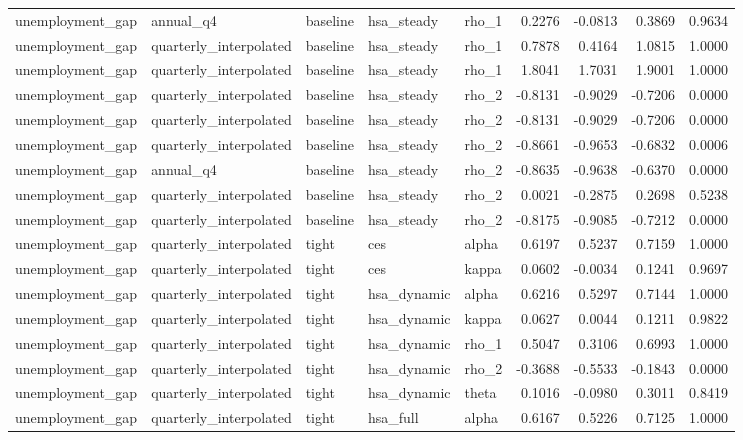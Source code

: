 \begin{tabular}{lllllrrrr}
unemployment\_gap & annual\_q4 & baseline & hsa\_steady & rho\_1 & 0.2276 & -0.0813 & 0.3869 & 0.9634 \\
unemployment\_gap & quarterly\_interpolated & baseline & hsa\_steady & rho\_1 & 0.7878 & 0.4164 & 1.0815 & 1.0000 \\
unemployment\_gap & quarterly\_interpolated & baseline & hsa\_steady & rho\_1 & 1.8041 & 1.7031 & 1.9001 & 1.0000 \\
unemployment\_gap & quarterly\_interpolated & baseline & hsa\_steady & rho\_2 & -0.8131 & -0.9029 & -0.7206 & 0.0000 \\
unemployment\_gap & quarterly\_interpolated & baseline & hsa\_steady & rho\_2 & -0.8131 & -0.9029 & -0.7206 & 0.0000 \\
unemployment\_gap & quarterly\_interpolated & baseline & hsa\_steady & rho\_2 & -0.8661 & -0.9653 & -0.6832 & 0.0006 \\
unemployment\_gap & annual\_q4 & baseline & hsa\_steady & rho\_2 & -0.8635 & -0.9638 & -0.6370 & 0.0000 \\
unemployment\_gap & quarterly\_interpolated & baseline & hsa\_steady & rho\_2 & 0.0021 & -0.2875 & 0.2698 & 0.5238 \\
unemployment\_gap & quarterly\_interpolated & baseline & hsa\_steady & rho\_2 & -0.8175 & -0.9085 & -0.7212 & 0.0000 \\
unemployment\_gap & quarterly\_interpolated & tight & ces & alpha & 0.6197 & 0.5237 & 0.7159 & 1.0000 \\
unemployment\_gap & quarterly\_interpolated & tight & ces & kappa & 0.0602 & -0.0034 & 0.1241 & 0.9697 \\
unemployment\_gap & quarterly\_interpolated & tight & hsa\_dynamic & alpha & 0.6216 & 0.5297 & 0.7144 & 1.0000 \\
unemployment\_gap & quarterly\_interpolated & tight & hsa\_dynamic & kappa & 0.0627 & 0.0044 & 0.1211 & 0.9822 \\
unemployment\_gap & quarterly\_interpolated & tight & hsa\_dynamic & rho\_1 & 0.5047 & 0.3106 & 0.6993 & 1.0000 \\
unemployment\_gap & quarterly\_interpolated & tight & hsa\_dynamic & rho\_2 & -0.3688 & -0.5533 & -0.1843 & 0.0000 \\
unemployment\_gap & quarterly\_interpolated & tight & hsa\_dynamic & theta & 0.1016 & -0.0980 & 0.3011 & 0.8419 \\
unemployment\_gap & quarterly\_interpolated & tight & hsa\_full & alpha & 0.6167 & 0.5226 & 0.7125 & 1.0000 \\

\end{tabular}
